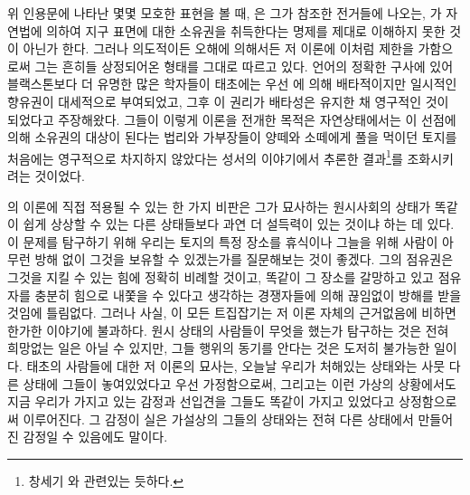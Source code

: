 위 인용문에 나타난 몇몇 모호한 표현을 볼 때,
은
그가 참조한 전거들에 나오는,
가 자연법에 의하여 지구 표면에 대한 소유권을 취득한다는
명제를 제대로 이해하지 못한 것이 아닌가 한다.
그러나
의도적이든 오해에 의해서든
저 이론에 이처럼 제한을 가함으로써
그는
흔히들 상정되어온 형태를 그대로 따르고 있다.
언어의 정확한 구사에 있어
블랙스톤보다 더
유명한 많은 학자들이
태초에는
우선
에 의해
배타적이지만 일시적인 향유권이 대세적으로
부여되었고,
그후 이 권리가 배타성은 유지한 채 영구적인 것이 되었다고
주장해왔다.
그들이 이렇게 이론을 전개한 목적은
자연상태에서는
이
선점에 의해
소유권의 대상이 된다는 법리와
가부장들이
양떼와 소떼에게 풀을 먹이던 토지를
처음에는
영구적으로 차지하지 않았다는
성서의 이야기에서
추론한 결과\footnote{%
  창세기 와 관련있는 듯하다.
}를
조화시키려는 것이었다.

의 이론에 직접 적용될 수 있는 한 가지 비판은
그가 묘사하는 원시사회의 상태가
똑같이 쉽게 상상할 수 있는 다른 상태들보다 과연 더 설득력이 있는 것이냐
하는 데 있다.
이 문제를 탐구하기 위해
우리는
토지의 특정 장소를 휴식이나 그늘을 위해
사람이 아무런 방해 없이 그것을 보유할 수 있겠는가를
질문해보는 것이 좋겠다.
그의 점유권은 그것을 지킬 수 있는 힘에 정확히 비례할 것이고,
똑같이 그 장소를 갈망하고 있고
점유자를
충분히
힘으로
내쫓을 수 있다고 생각하는
경쟁자들에 의해 끊임없이 방해를 받을 것임에 틀림없다.
그러나 사실,
이 모든 트집잡기는 저 이론 자체의 근거없음에 비하면 한가한 이야기에 불과하다.
원시 상태의 사람들이 무엇을 했는가 탐구하는 것은
전혀 희망없는 일은 아닐 수 있지만,
그들 행위의 동기를 안다는 것은 도저히 불가능한 일이다.
태초의 사람들에 대한 저 이론의 묘사는,
오늘날 우리가 처해있는 상태와는 사뭇 다른 상태에
그들이 놓여있었다고 우선 가정함으로써,
그리고는
이런 가상의 상황에서도
지금 우리가 가지고 있는 감정과 선입견을
그들도
똑같이 가지고 있었다고 상정함으로써 이루어진다.
그 감정이 실은 가설상의 그들의 상태와는 전혀 다른 상태에서
만들어진 감정일 수 있음에도 말이다.

